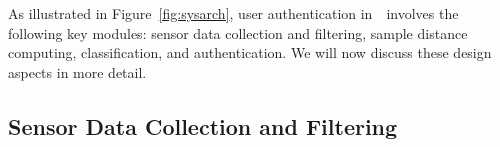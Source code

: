 As illustrated in Figure~\ref{fig:sysarch}, user
authentication in~\systemname~involves the following key modules: sensor data collection and filtering, sample distance computing, classification, and authentication.
%
%
We will now discuss these design aspects in more detail.
\subsection{Sensor Data Collection and Filtering}

